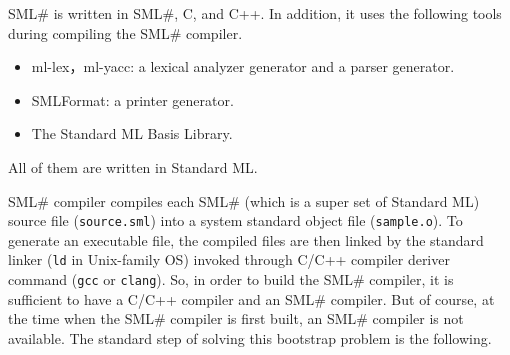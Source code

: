 \documentclass{jbook}
\newcommand{\smlsharp}{SML\#}
\begin{document}
	\smlsharp{} is written in \smlsharp{}, C, and C++.
	In addition, it uses the following tools during compiling the
\smlsharp{} compiler.
\begin{itemize}
\item ml-lex，ml-yacc: a lexical analyzer generator and a parser generator.
\item SMLFormat: a printer generator.
\item The Standard ML Basis Library.
\end{itemize}
	All of them are written in Standard ML.

	\smlsharp{} compiler compiles each \smlsharp{} (which is a super
set of Standard ML) source file ({\tt source.sml}) into a system standard
object file ({\tt sample.o}).
	To generate an executable file, the compiled files are then linked
by the standard linker ({\tt ld} in Unix-family OS) invoked through
C/C++ compiler deriver command ({\tt gcc} or {\tt clang}).
	So, in order to build the \smlsharp{} compiler, it is sufficient
to have a C/C++ compiler and an \smlsharp{} compiler.
	But of course, at the time when the \smlsharp{} compiler is
first built, an \smlsharp{} compiler is not available.
	The standard step of solving this bootstrap problem is the
following.
\end{document}
